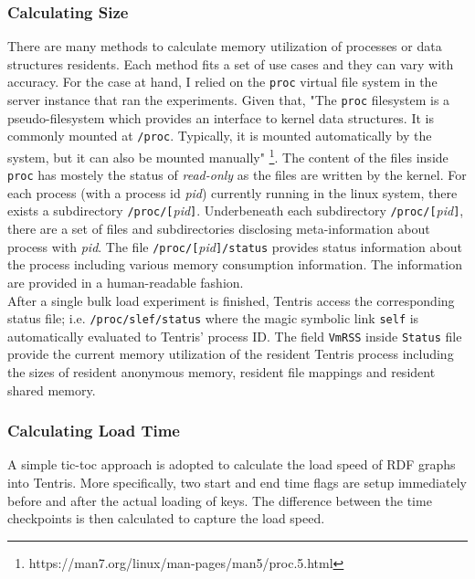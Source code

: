 \subsubsection{Calculating Size}
There are many methods to calculate memory utilization of processes or data structures residents. 
Each method fits a set of use cases and they can vary with accuracy.
For the case at hand, I relied on the \verb|proc| virtual file system in the server instance that ran the experiments. Given that, "The \verb|proc| filesystem is a pseudo-filesystem which provides an
interface to kernel data structures.  It is commonly mounted at
\verb|/proc|.  
Typically, it is mounted automatically by the system, but it can also be mounted manually" \footnote{https://man7.org/linux/man-pages/man5/proc.5.html}. The content of the files inside \verb|proc| has mostely the status of \textit{read-only} as the files are written by the kernel. 
For each process (with a process id \textit{pid}) currently running in the linux system, there exists a subdirectory \verb|/proc/[|\textit{pid}\verb|]|. 
Underbeneath each subdirectory \verb|/proc/[|\textit{pid}\verb|]|, there are a set of files and subdirectories disclosing meta-information about process with \textit{pid}. The file \verb|/proc/[|\textit{pid}\verb|]/status| provides status information about the process including various memory consumption information. The information are provided in a human-readable fashion. \\

After a single bulk load experiment is finished, Tentris access the corresponding status file; i.e. \verb|/proc/slef/status| where the magic symbolic link \verb|self| is automatically evaluated to Tentris' process ID. The field \verb|VmRSS| inside \verb|Status| file provide the current memory utilization of the resident Tentris process including the sizes of resident anonymous memory, resident file mappings and resident shared memory. 

\subsubsection{Calculating Load Time}
A simple tic-toc approach is adopted to calculate the load speed of RDF graphs into Tentris. More specifically, two start and end time flags are setup immediately before and after the actual loading of keys. The difference between the time checkpoints is then calculated to capture the load speed.  \\

